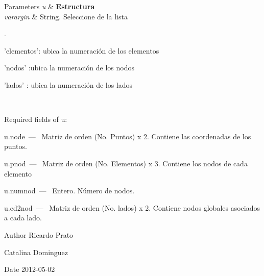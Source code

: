 \begin{DoxyParams}{Parameters}
{\em u} & {\bfseries Estructura} \\
\hline
{\em varargin} & String. Seleccione de la lista 
\begin{DoxyCode}
\end{DoxyCode}
.
\begin{DoxyItemize}
\item \begin{DoxyVerb}'elementos': ubica la numeración de los elementos \end{DoxyVerb}

\item \begin{DoxyVerb}'nodos' :ubica la numeración de los nodos  \end{DoxyVerb}

\item \begin{DoxyVerb}'lados' : ubica la numeración de los lados  \end{DoxyVerb}

\end{DoxyItemize}\\
\hline
\end{DoxyParams}
\begin{DoxyParagraph}{Required fields of u\-:}
\begin{DoxyItemize}
\item {\ttfamily u.\-node~---~} Matriz de orden (No. Puntos) x 2. Contiene las coordenadas de los puntos. \item {\ttfamily u.\-pnod~---~} Matriz de orden (No. Elementos) x 3. Contiene los nodos de cada elemento \item {\ttfamily u.\-numnod~---~} Entero. Número de nodos. \item {\ttfamily u.\-ed2nod~---~} Matriz de orden (No. lados) x 2. Contiene nodos globales asociados a cada lado. \end{DoxyItemize}

\end{DoxyParagraph}
\begin{DoxyAuthor}{Author}
Ricardo Prato 

Catalina Dominguez 
\end{DoxyAuthor}
\begin{DoxyDate}{Date}
2012-\/05-\/02 
\end{DoxyDate}
